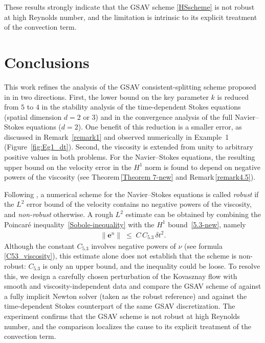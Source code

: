 \documentclass{article}
\theoremstyle{definition}                   %
\begin{document}
These results strongly indicate that the GSAV scheme \eqref{HSscheme} is not robust at high Reynolds number, and the limitation is intrinsic to its explicit treatment of the convection term.


\section{Conclusions}
\label{sec-discussion}
This work refines the analysis of the GSAV consistent-splitting scheme proposed in \cite{HuangShen2023} in two directions.  First, the lower bound on the key parameter $k$ is reduced from $5$ to $4$ in the stability analysis of the time-dependent Stokes equations (spatial dimension $d=2$ or $3$) and in the convergence analysis of the full Navier--Stokes equations ($d=2$).  One benefit of this reduction is a smaller error, as discussed in Remark~\ref{remark1} and observed numerically in Example~1 (Figure~\ref{fig:Eg1_dt}).
Second, the viscosity is extended from unity to arbitrary positive values in both problems.  For the Navier--Stokes equations, the resulting upper bound on the velocity error in the $H^{1}$ norm is found to depend on negative powers of the viscosity (see Theorem\,\ref{Theorem 7-new} and  Remark\,\ref{remark4.5}).

Following \cite{John2021}, a numerical scheme for the Navier--Stokes equations is called \emph{robust} if the $L^{2}$ error bound of the velocity contains no negative powers of the viscosity, and \emph{non-robust} otherwise.  A rough $L^{2}$ estimate can be obtained by combining the Poincar\'e inequality~\eqref{Sobole-inequality} with the $H^{1}$ bound~\eqref{5.3-new}, namely
\begin{align}
\|\mathbf{e}^{n}\|\;\le\; C\,C_{5.3}\,\delta t^{2}.
\end{align}
Although the constant $C_{5.3}$ involves negative powers of $\nu$ (see formula \eqref{C53_viscosity}), this estimate alone does not establish that the scheme is non-robust: $C_{5.3}$ is only an upper bound, and the inequality could be loose.
To resolve this, we design a carefully chosen perturbation of the Kovasznay flow with smooth and viscosity-independent data and compare the GSAV scheme of \cite{HuangShen2023} against a fully implicit Newton solver (taken as the robust reference) and against the time-dependent Stokes counterpart of the same GSAV discretization.  The experiment confirms that the GSAV scheme is not robust at high Reynolds number, and the comparison localizes the cause to its explicit treatment of the convection term.
\end{document}
